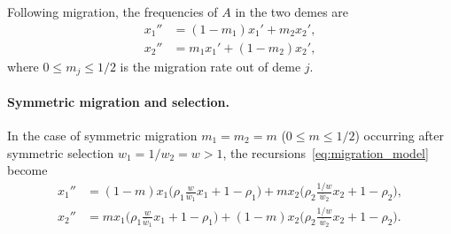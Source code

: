 \documentclass[14pt]{extarticle}
\begin{document}
Following migration, the frequencies of $A$ in the two demes are
\begin{equation} \label{eq:migration_model}
\begin{aligned}
x_1'' &= (1-m_1) x_1' + m_2 x_2', \\
x_2'' &= m_1 x_1' + (1-m_2) x_2',
\end{aligned}
\end{equation}
where $0 \le m_j \le 1/2$ is the migration rate out of deme $j$. 

\paragraph{Symmetric migration and selection.}
 
In the case of symmetric migration $m_1=m_2=m$ ($0\le m \le1/2$) occurring after symmetric selection $w_1=1/w_2=w>1$, the recursions~\eqref{eq:migration_model} become
\begin{equation}\begin{aligned} \label{eq:migration_model_unconditional_symmetric}
x_1'' &= (1-m)x_1\Big(\rho_1 \frac{w}{\overline w_1} x_1 + 1-\rho_1 \Big) + m x_2\Big(\rho_2 \frac{1/w}{\overline w_2} x_2 + 1-\rho_2 \Big), \\
x_2'' &= m x_1\Big(\rho_1 \frac{w}{\overline w_1} x_1 + 1-\rho_1 \Big) + (1-m) x_2\Big(\rho_2 \frac{1/w}{\overline w_2} x_2 + 1-\rho_2 \Big).
\end{aligned}
\end{equation}
\end{document}
